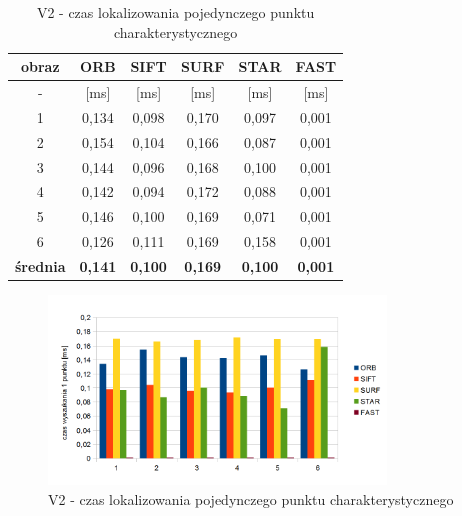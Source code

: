 \begin{table}[htbp]
  \centering
  \caption{V2 - czas lokalizowania pojedynczego punktu charakterystycznego}
    \begin{tabular}{|c|c|c|c|c|c|}
    \hline
    obraz & \textbf{ORB} & \textbf{SIFT} & \textbf{SURF} & \textbf{STAR} & \textbf{FAST} \\
    \hline
    -  & [ms] & [ms] & [ms] & [ms] & [ms] \\
    1 & 0,134 & 0,098 & 0,170 & 0,097 & 0,001 \\
    2 & 0,154 & 0,104 & 0,166 & 0,087 & 0,001 \\
    3 & 0,144 & 0,096 & 0,168 & 0,100 & 0,001 \\
    4 & 0,142 & 0,094 & 0,172 & 0,088 & 0,001 \\
    5 & 0,146 & 0,100 & 0,169 & 0,071 & 0,001 \\
    6 & 0,126 & 0,111 & 0,169 & 0,158 & 0,001 \\\hline
    \textbf{średnia} & \textbf{0,141} & \textbf{0,100} & \textbf{0,169} & \textbf{0,100} & \textbf{0,001} \\
    \hline
    \end{tabular}%
  \label{tab:v2_f2}%
\end{table}%


\begin{figure}
\centering
\includegraphics[width=0.8\textwidth]{pict/slowik/v2/f2.png}
\caption{V2 - czas lokalizowania pojedynczego punktu charakterystycznego}
\label{fig:v2_f2}
\end{figure}

